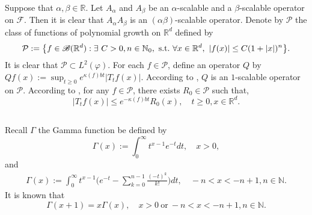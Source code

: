 \documentclass[12pt,oneside,english]{amsart}
\theoremstyle{plain}
\theoremstyle{definition}
\numberwithin{equation}{section}
\newcommand{\added}[1]{{\color{blue}#1}}\newcommand{\deleted}[1]{{\color{red}#1}}
\begin{document}
    Suppose that $\alpha, \beta \in \mathbb R$.
    Let $A_\alpha$ and $A_\beta$ be an $\alpha$-scalable and a $\beta$-scalable operator on $\mathcal F$.
    Then it is clear that $A_\alpha A_\beta$ is an $(\alpha\beta)$-scalable operator.
    Denote by $\mathcal P$ the class of functions of polynomial growth on $\mathbb R^d$ defined by
\begin{equation}
    \mathcal{P}
    :=\big \{f\in \mathscr B(\mathbb{R}^d):\exists~ C>0, n \in \mathbb N_0, {\rm ~s.t.~} \forall x\in \mathbb{R}^d,~ |f(x)|\leq C(1+|x|)^n\big\}.
\end{equation}
    It is clear that $\mathcal{P} \subset L^2(\varphi)$.
    \added{ For each $f\in \mathcal {P}$, define an operator $Q$ by $Qf(x):=\sup_{t\geq 0}e^{\kappa(f)bt} |T_tf(x)|$.}
\added{
    According to \cite[Fact 1.2]{MM}, $Q$ is an $1$-scalable operator on $\mathcal P$.
}
\deleted{
    According to \cite[Fact 1.2]{MM}, for any $f \in \mathcal{P}$, there exists $R_0 \in \mathcal{P}$ such that,
\begin{equation}
\label{eq:semigroupineq}
    |T_tf(x)|
    \leq e^{-\kappa(f)bt} R_0(x),
    \quad t\geq 0, x\in \mathbb R^d.
\end{equation}
}

\subsection{}
    Recall $\Gamma$ the Gamma function be defined by
\begin{equation}
    \Gamma (x) := \int_0^\infty t^{x-1} e^{-t}dt,
    \quad x>0,
\end{equation}
and
\begin{align}
\label{eq: definition of Gamma function}
    \Gamma(x)
    := \int_0^\infty t^{x-1} \Big(e^{-t} - \sum_{k=0}^{n-1} \frac{(-t)^k}{k!}\Big) dt,
    \quad -n< x< -n+1, n\in \mathbb N.
\end{align}
    It is known that
\begin{equation}
    \Gamma(x+1) = x\Gamma(x),
    \quad x>0~\text{or}~-n< x< -n+1, n\in \mathbb N.
\end{equation}
\end{document}
